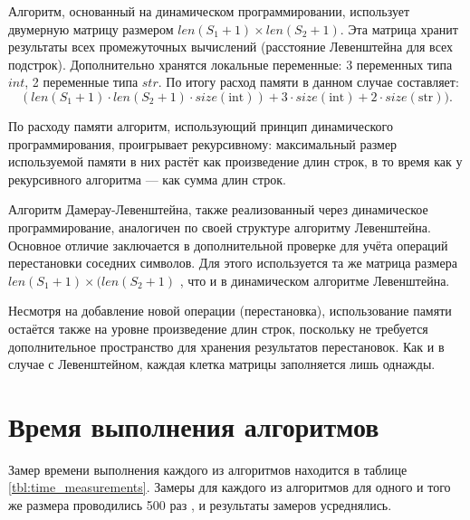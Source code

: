 \medskip

Алгоритм, основанный на динамическом программировании,
использует двумерную матрицу размером $len(S_{1} + 1) \times len(S_{2} + 1)$.
Эта матрица хранит результаты всех промежуточных вычислений
(расстояние Левенштейна для всех подстрок). Дополнительно хранятся локальные
переменные: 3 переменных типа $int$, 2 переменные типа $str$.
По итогу расход памяти в данном случае составляет:
\begin{equation}
	(len(S_{1} + 1) \cdot len(S_{2} + 1) \cdot size(\text{int})) + 3 \cdot size(\text{int}) + 2 \cdot size(\text{str})).
\end{equation}


По расходу памяти алгоритм, использующий принцип динамического программирования,
проигрывает рекурсивному: максимальный размер используемой памяти в
них растёт как произведение длин строк, в то время как у рекурсивного
алгоритма — как сумма длин строк.

\medskip

Алгоритм Дамерау-Левенштейна, также реализованный через динамическое программирование,
аналогичен по своей структуре алгоритму Левенштейна. Основное отличие заключается в
дополнительной проверке для учёта операций перестановки соседних символов.
Для этого используется та же матрица размера 
$len(S_{1} + 1) \times (len(S_{2} + 1)$
, что и в динамическом алгоритме Левенштейна.

Несмотря на добавление новой операции (перестановка), использование памяти
остаётся также на уровне произведение длин строк, поскольку не требуется дополнительное
пространство для хранения результатов перестановок. Как и в случае с Левенштейном,
каждая клетка матрицы заполняется лишь однажды.

\clearpage

\section{Время выполнения алгоритмов}


Замер времени выполнения каждого из алгоритмов находится в таблице \ref{tbl:time_measurements}.
Замеры для каждого из алгоритмов для одного и того же размера проводились 500 раз
, и результаты замеров усреднялись. 

